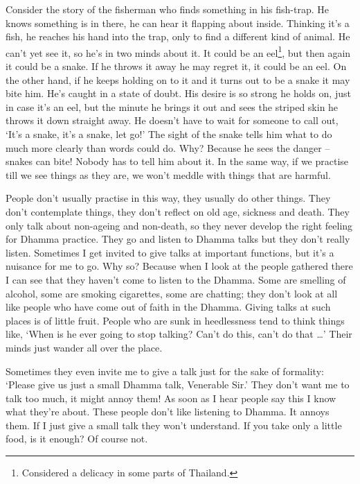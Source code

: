 Consider the story of the fisherman who finds something in his fish-trap. He knows something is in there, he can hear it flapping about inside. Thinking it's a fish, he reaches his hand into the trap, only to find a different kind of animal. He can't yet see it, so he's in two minds about it. It could be an eel\footnote{Considered a delicacy in some parts of Thailand.}, but then again it could be a snake. If he throws it away he may regret it, it could be an eel. On the other hand, if he keeps holding on to it and it turns out to be a snake it may bite him. He's caught in a state of doubt. His desire is so strong he holds on, just in case it's an eel, but the minute he brings it out and sees the striped skin he throws it down straight away. He doesn't have to wait for someone to call out, `It's a snake, it's a snake, let go!' The sight of the snake tells him what to do much more clearly than words could do. Why? Because he sees the danger -- snakes can bite! Nobody has to tell him about it. In the same way, if we practise till we see things as they are, we won't meddle with things that are harmful.

People don't usually practise in this way, they usually do other things. They don't contemplate things, they don't reflect on old age, sickness and death. They only talk about non-ageing and non-death, so they never develop the right feeling for Dhamma practice. They go and listen to Dhamma talks but they don't really listen. Sometimes I get invited to give talks at important functions, but it's a nuisance for me to go. Why so? Because when I look at the people gathered there I can see that they haven't come to listen to the Dhamma. Some are smelling of alcohol, some are smoking cigarettes, some are chatting; they don't look at all like people who have come out of faith in the Dhamma. Giving talks at such places is of little fruit. People who are sunk in heedlessness tend to think things like, `When is he ever going to stop talking? Can't do this, can't do that \ldots{}' Their minds just wander all over the place.

Sometimes they even invite me to give a talk just for the sake of formality: `Please give us just a small Dhamma talk, Venerable Sir.' They don't want me to talk too much, it might annoy them! As soon as I hear people say this I know what they're about. These people don't like listening to Dhamma. It annoys them. If I just give a small talk they won't understand. If you take only a little food, is it enough? Of course not.

